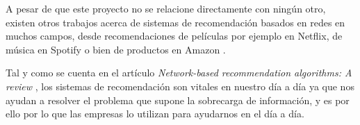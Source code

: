 A pesar de que este proyecto no se relacione directamente con ningún otro, existen otros trabajos acerca de sistemas de recomendación basados en redes en muchos campos, desde recomendaciones de películas por ejemplo en Netflix, de música en Spotify o bien de productos en Amazon \cite{wiki:amazon}.

Tal y como se cuenta en el artículo \textit{Network-based recommendation algorithms: A review} \cite{yu2015}, los sistemas de recomendación son vitales en nuestro día a día ya que nos ayudan a resolver el problema que supone la sobrecarga de información, y es por ello por lo que las empresas lo utilizan para ayudarnos en el día a día.